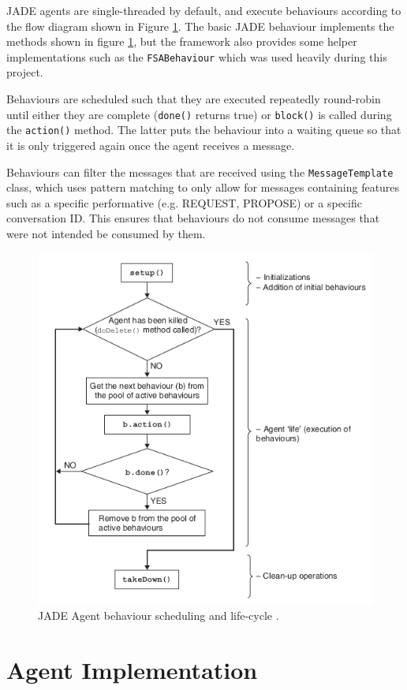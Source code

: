\documentclass{article}
\begin{document}
JADE agents are single-threaded by default, and execute behaviours according to the flow diagram shown in Figure \ref{fig:behaviour}. The basic JADE behaviour implements the methods shown in figure \ref{fig:behaviour}, but the framework also provides some helper implementations such as the \lstinline{FSABehaviour} which was used heavily during this project. 

Behaviours are scheduled such that they are executed repeatedly round-robin until either they are complete (\lstinline{done()} returns true) or \lstinline{block()} is called during the \lstinline{action()} method. The latter puts the behaviour into a waiting queue so that it is only triggered again once the agent receives a message. 

Behaviours can filter the messages that are received using the \lstinline{MessageTemplate} class, which uses pattern matching to only allow for messages containing features such as a specific performative (e.g. REQUEST, PROPOSE) or a specific conversation ID. This ensures that behaviours do not consume messages that were not intended be consumed by them. 

\begin{figure}[!ht]
	\centering
	\includegraphics[width=0.8\linewidth]{images/behaviour}
	\caption{JADE Agent behaviour scheduling and life-cycle \cite{jade}.}
	\label{fig:behaviour}
\end{figure}

\section{Agent Implementation} \label{sec:agentimpl}
\end{document}
